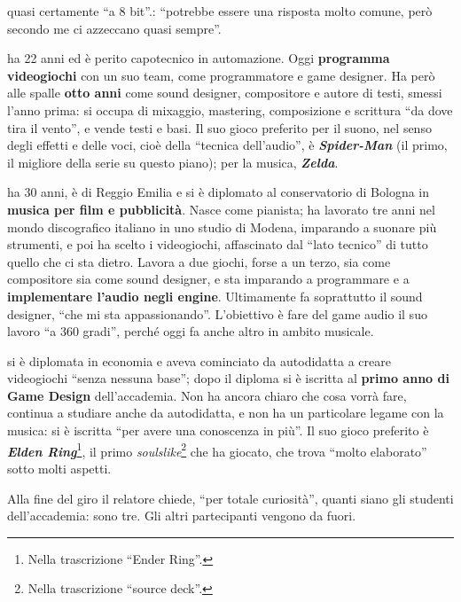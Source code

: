 \begin{description}
{        quasi certamente ``a 8 bit''.}: ``potrebbe essere una risposta molto
        comune, però secondo me ci azzeccano quasi sempre''.
  \item[Giacomo] ha 22 anni ed è perito capotecnico in automazione. Oggi
        \textbf{programma videogiochi} con un suo team, come programmatore e
        game designer. Ha però alle spalle \textbf{otto anni} come sound
        designer, compositore e autore di testi, smessi l'anno prima: si occupa
        di mixaggio, mastering, composizione e scrittura ``da dove tira il
        vento'', e vende testi e basi. Il suo gioco preferito per il suono, nel
        senso degli effetti e delle voci, cioè della ``tecnica dell'audio'', è
        \textbf{\emph{Spider-Man}} (il primo, il migliore della serie su questo
        piano); per la musica, \textbf{\emph{Zelda}}.
  \item[Giovanni] ha 30 anni, è di Reggio Emilia e si è diplomato al
        conservatorio di Bologna in \textbf{musica per film e pubblicità}.
        Nasce come pianista; ha lavorato tre anni nel mondo discografico
        italiano in uno studio di Modena, imparando a suonare più strumenti, e
        poi ha scelto i videogiochi, affascinato dal ``lato tecnico'' di tutto
        quello che ci sta dietro. Lavora a due giochi, forse a un terzo, sia come
        compositore sia come sound designer, e sta imparando a programmare e a
        \textbf{implementare l'audio negli engine}. Ultimamente fa soprattutto
        il sound designer, ``che mi sta appassionando''. L'obiettivo è fare del
        game audio il suo lavoro ``a 360 gradi'', perché oggi fa anche altro in
        ambito musicale.
  \item[Nicole] si è diplomata in economia e aveva cominciato da autodidatta a
        creare videogiochi ``senza nessuna base''; dopo il diploma si è iscritta
        al \textbf{primo anno di Game Design} dell'accademia. Non ha ancora chiaro
        che cosa vorrà fare, continua a studiare anche da autodidatta, e non ha
        un particolare legame con la musica: si è iscritta ``per avere una
        conoscenza in più''. Il suo gioco preferito è \textbf{\emph{Elden
        Ring}}\footnote{Nella trascrizione ``Ender Ring''.}, il primo
        \emph{soulslike}\footnote{Nella trascrizione ``source deck''.} che ha
        giocato, che trova ``molto elaborato'' sotto molti aspetti.
\end{description}

Alla fine del giro il relatore chiede, ``per totale curiosità'', quanti siano gli
studenti dell'accademia: sono tre. Gli altri partecipanti vengono da fuori.

